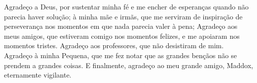 \begin{agradecimentos}
	Agradeço a Deus, por sustentar minha fé e me encher de esperanças quando não parecia haver solução; à minha mãe e irmãs, que me serviram de inspiração de perseverança nos momentos em que nada parecia valer à pena; Agradeço aos meus amigos, que estiveram comigo nos momentos felizes, e me apoiaram nos momentos tristes. Agradeço aos professores, que não desistiram de mim. Agradeço à minha Pequena, que me fez notar que as grandes bençãos não se prendem a grandes coisas. E finalmente, agradeço ao meu grande amigo, Maddox, eternamente vigilante.
\end{agradecimentos}
